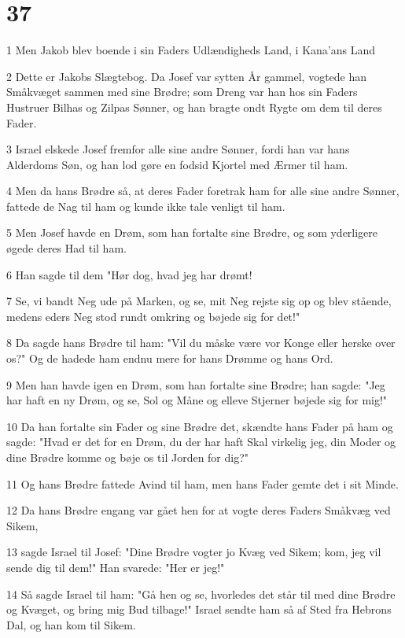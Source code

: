 \chapter{37}

\par 1 Men Jakob blev boende i sin Faders Udlændigheds Land, i Kana'ans Land
\par 2 Dette er Jakobs Slægtebog. Da Josef var sytten År gammel, vogtede han Småkvæget sammen med sine Brødre; som Dreng var han hos sin Faders Hustruer Bilhas og Zilpas Sønner, og han bragte ondt Rygte om dem til deres Fader.
\par 3 Israel elskede Josef fremfor alle sine andre Sønner, fordi han var hans Alderdoms Søn, og han lod gøre en fodsid Kjortel med Ærmer til ham.
\par 4 Men da hans Brødre så, at deres Fader foretrak ham for alle sine andre Sønner, fattede de Nag til ham og kunde ikke tale venligt til ham.
\par 5 Men Josef havde en Drøm, som han fortalte sine Brødre, og som yderligere øgede deres Had til ham.
\par 6 Han sagde til dem "Hør dog, hvad jeg har drømt!
\par 7 Se, vi bandt Neg ude på Marken, og se, mit Neg rejste sig op og blev stående, medens eders Neg stod rundt omkring og bøjede sig for det!"
\par 8 Da sagde hans Brødre til ham: "Vil du måske være vor Konge eller herske over os?" Og de hadede ham endnu mere for hans Drømme og hans Ord.
\par 9 Men han havde igen en Drøm, som han fortalte sine Brødre; han sagde: "Jeg har haft en ny Drøm, og se, Sol og Måne og elleve Stjerner bøjede sig for mig!"
\par 10 Da han fortalte sin Fader og sine Brødre det, skændte hans Fader på ham og sagde: "Hvad er det for en Drøm, du der har haft Skal virkelig jeg, din Moder og dine Brødre komme og bøje os til Jorden for dig?"
\par 11 Og hans Brødre fattede Avind til ham, men hans Fader gemte det i sit Minde.
\par 12 Da hans Brødre engang var gået hen for at vogte deres Faders Småkvæg ved Sikem,
\par 13 sagde Israel til Josef: "Dine Brødre vogter jo Kvæg ved Sikem; kom, jeg vil sende dig til dem!" Han svarede: "Her er jeg!"
\par 14 Så sagde Israel til ham: "Gå hen og se, hvorledes det står til med dine Brødre og Kvæget, og bring mig Bud tilbage!" Israel sendte ham så af Sted fra Hebrons Dal, og han kom til Sikem.
